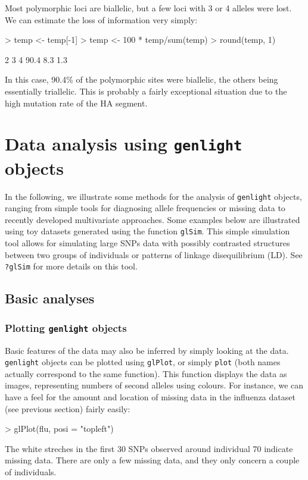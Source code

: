 \documentclass{article}
\begin{document}
\noindent Most polymorphic loci are biallelic, but a few loci with 3 or 4 alleles were lost.
We can estimate the loss of information very simply:
\begin{Schunk}
\begin{Sinput}
> temp <- temp[-1]
> temp <- 100 * temp/sum(temp)
> round(temp, 1)
\end{Sinput}
\begin{Soutput}
   2    3    4 
90.4  8.3  1.3 
\end{Soutput}
\end{Schunk}
In this case, 90.4\% of the polymorphic sites were biallelic, the others being
essentially triallelic.
This is probably a fairly exceptional situation due to the high mutation rate of the HA segment.







\section{Data analysis using \texttt{genlight} objects}

In the following, we illustrate some methods for the analysis of \texttt{genlight} objects, ranging
from simple tools for diagnosing allele frequencies or missing data to recently developed multivariate approaches.
Some examples below are illustrated using toy datasets generated using the function \texttt{glSim}.
This simple simulation tool allows for simulating large SNPs data with possibly contrasted
structures between two groups of individuals or patterns of linkage disequilibrium (LD).
See \texttt{?glSim} for more details on this tool.


\subsection{Basic analyses}


\subsubsection{Plotting \texttt{genlight} objects}
Basic features of the data may also be inferred by simply looking at the data.
\texttt{genlight} objects can be plotted using \texttt{glPlot}, or simply \texttt{plot} (both names
actually correspond to the same function).
This function displays the data as images, representing numbers of second alleles using colours.
For instance, we can have a feel for the amount and location of missing data in the influenza
dataset (see previous section) fairly easily:
\begin{Schunk}
\begin{Sinput}
> glPlot(flu, posi = "topleft")
\end{Sinput}
\end{Schunk}
The white streches in the first 30 SNPs observed around individual 70 indicate missing data.
There are only a few missing data, and they only concern a couple of individuals.
\\
\end{document}
